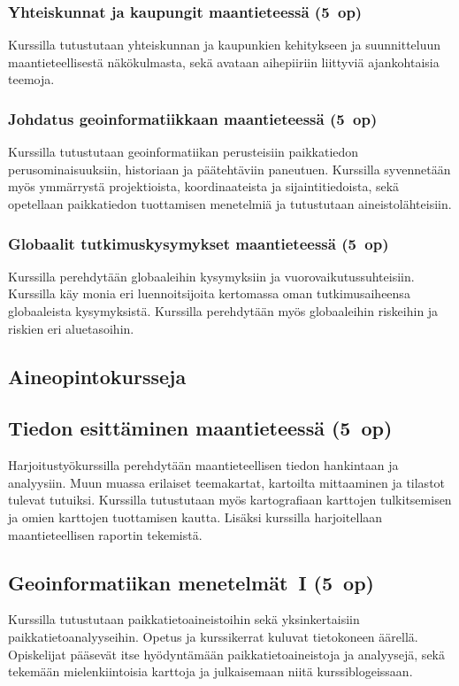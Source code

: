 \documentclass[../ala_hataile.tex]{subfiles}
\begin{document}
\subsubsection*{Yhteiskunnat ja kaupungit maantieteessä (5~op)}
Kurssilla tutustutaan yhteiskunnan ja kaupunkien
kehitykseen ja suunnitteluun maantieteellisestä
näkökulmasta, sekä avataan aihepiiriin liittyviä
ajankohtaisia teemoja. 

\subsubsection*{Johdatus geoinformatiikkaan maantieteessä (5~op)}
Kurssilla tutustutaan geoinformatiikan perusteisiin 
paikkatiedon perusominaisuuksiin, historiaan ja päätehtäviin paneutuen.
Kurssilla syvennetään myös ymmärrystä projektioista, koordinaateista
ja sijaintitiedoista, sekä opetellaan paikkatiedon tuottamisen
menetelmiä ja tutustutaan aineistolähteisiin.

\subsubsection*{Globaalit tutkimuskysymykset maantieteessä (5~op)}
Kurssilla perehdytään globaaleihin kysymyksiin ja 
vuorovaikutussuhteisiin. Kurssilla käy monia eri 
luennoitsijoita kertomassa oman tutkimusaiheensa
globaaleista kysymyksistä. Kurssilla perehdytään myös 
globaaleihin riskeihin ja riskien eri aluetasoihin.

\subsection*{Aineopintokursseja}
\subsection*{Tiedon esittäminen maantieteessä (5~op)}
Harjoitustyökurssilla perehdytään
maantieteellisen tiedon hankintaan
ja analyysiin. Muun muassa erilaiset teemakartat, kartoilta
mittaaminen ja tilastot tulevat tutuiksi.
Kurssilla tutustutaan myös kartografiaan
karttojen tulkitsemisen ja omien
karttojen tuottamisen kautta. Lisäksi 
kurssilla harjoitellaan maantieteellisen 
raportin tekemistä.

\subsection*{Geoinformatiikan menetelmät~I (5~op)}
Kurssilla tutustutaan paikkatietoaineistoihin
sekä yksinkertaisiin paikkatietoanalyyseihin.
Opetus ja kurssikerrat
kuluvat tietokoneen äärellä. 
Opiskelijat pääsevät itse hyödyntämään 
paikkatietoaineistoja ja analyysejä, sekä tekemään
mielenkiintoisia karttoja ja julkaisemaan niitä
kurssiblogeissaan.
\end{document}
